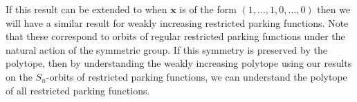 If this result can be extended to when $\mathbf{x}$ is of the form $(1, \dots, 1, 0, \dots, 0)$ then we will have a similar result for weakly increasing restricted parking functions. Note that these correspond to orbits of regular restricted parking functions under the natural action of the symmetric group. If this symmetry is preserved by the polytope, then by understanding the weakly increasing polytope using our results on the $S_{n}$-orbits of restricted parking functions, we can understand the polytope of all restricted parking functions.
